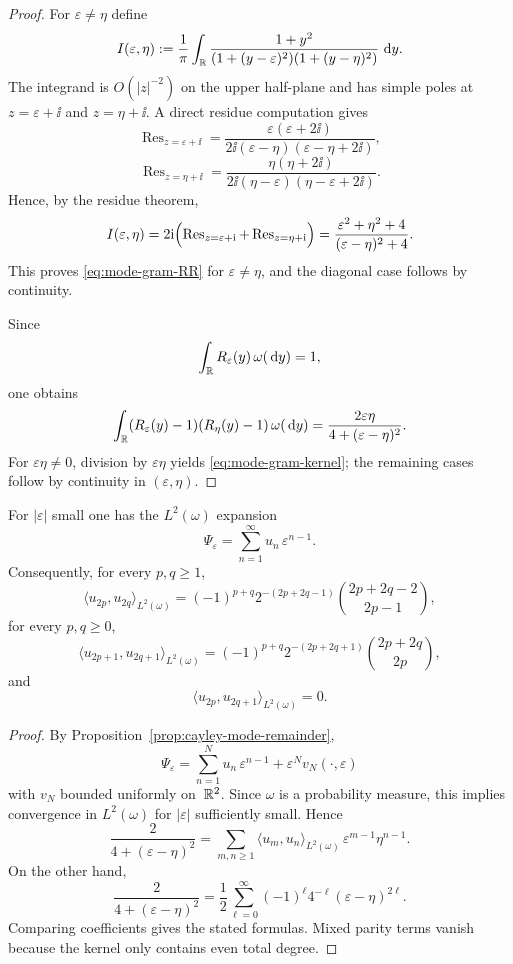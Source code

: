 \begin{proof}
For $\varepsilon\neq\eta$ define
\[
I(\varepsilon,\eta)
:=\frac{1}{\pi}\int_{\mathbb{R}}
\frac{1+y^2}{(1+(y-\varepsilon)^2)(1+(y-\eta)^2)}\,\,\mathrm{d} y.
\]
The integrand is $O(|z|^{-2})$ on the upper half-plane and has simple
poles at $z=\varepsilon+\ii$ and $z=\eta+\ii$.  A direct residue
computation gives
\[
\operatorname{Res}_{z=\varepsilon+\ii}
=\frac{\varepsilon(\varepsilon+2\ii)}
{2\ii(\varepsilon-\eta)(\varepsilon-\eta+2\ii)},
\]
\[
\operatorname{Res}_{z=\eta+\ii}
=\frac{\eta(\eta+2\ii)}
{2\ii(\eta-\varepsilon)(\eta-\varepsilon+2\ii)}.
\]
Hence, by the residue theorem,
\[
I(\varepsilon,\eta)
=2\mathrm{i}\Bigl(
\operatorname{Res}_{z=\varepsilon+\mathrm{i}}
+\operatorname{Res}_{z=\eta+\mathrm{i}}
\Bigr)
=\frac{\varepsilon^2+\eta^2+4}{(\varepsilon-\eta)^2+4}.
\]
This proves \eqref{eq:mode-gram-RR} for $\varepsilon\neq\eta$, and the
diagonal case follows by continuity.

Since
\[
\int_{\mathbb{R}}R_\varepsilon(y)\,\omega(\,\mathrm{d} y)=1,
\]
one obtains
\[
\int_{\mathbb{R}}(R_\varepsilon(y)-1)(R_\eta(y)-1)\,\omega(\,\mathrm{d} y)
=\frac{2\varepsilon\eta}{4+(\varepsilon-\eta)^2}.
\]
For $\varepsilon\eta\neq 0$, division by $\varepsilon\eta$ yields
\eqref{eq:mode-gram-kernel}; the remaining cases follow by continuity in
$(\varepsilon,\eta)$.
\end{proof}

\begin{corollary}%
\label{cor:mode-quadratic-integrals}
For $|\varepsilon|$ small one has the $L^2(\omega)$ expansion
\[
\Psi_\varepsilon
=\sum_{n=1}^{\infty}u_n\,\varepsilon^{n-1}.
\]
Consequently, for every $p,q\ge 1$,
\[
\langle u_{2p},u_{2q}\rangle_{L^2(\omega)}
=(-1)^{p+q}2^{-(2p+2q-1)}
\binom{2p+2q-2}{2p-1},
\]
for every $p,q\ge 0$,
\[
\langle u_{2p+1},u_{2q+1}\rangle_{L^2(\omega)}
=(-1)^{p+q}2^{-(2p+2q+1)}
\binom{2p+2q}{2p},
\]
and
\[
\langle u_{2p},u_{2q+1}\rangle_{L^2(\omega)}=0.
\]
\end{corollary}

\begin{proof}
By Proposition~\ref{prop:cayley-mode-remainder},
\[
\Psi_\varepsilon
=\sum_{n=1}^{N}u_n\,\varepsilon^{n-1}
+\varepsilon^N v_N(\cdot,\varepsilon)
\]
with $v_N$ bounded uniformly on~$\mathbb{R}^2$.  Since $\omega$ is a probability
measure, this implies convergence in $L^2(\omega)$ for $|\varepsilon|$
sufficiently small.  Hence
\[
\frac{2}{4+(\varepsilon-\eta)^2}
=\sum_{m,n\ge 1}
\langle u_m,u_n\rangle_{L^2(\omega)}\,
\varepsilon^{m-1}\eta^{n-1}.
\]
On the other hand,
\[
\frac{2}{4+(\varepsilon-\eta)^2}
=\frac12\sum_{\ell=0}^{\infty}
(-1)^\ell 4^{-\ell}(\varepsilon-\eta)^{2\ell}.
\]
Comparing coefficients gives the stated formulas.  Mixed parity terms
vanish because the kernel only contains even total degree.
\end{proof}

